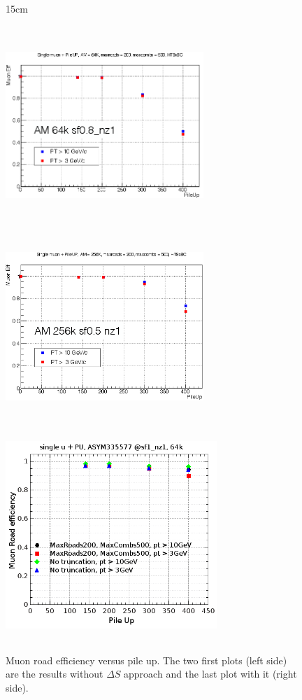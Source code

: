 \begin{figure}[htbp]{15cm}
	\caption{Muon road efficiency versus pile up. The two first plots (left side) are the results without $\Delta S$ approach and the last plot with it (right side).}
	\centering
	\includegraphics[width=7.5cm,height=7.5cm]{AppendixCMSL1TT/luciano_mupu_sf0p8_plot}\\
	\includegraphics[width=7.5cm,height=7.5cm]{AppendixCMSL1TT/luciano_mupu_sf0p5_plot}\\
	\includegraphics[width=8cm,height=8cm]{AppendixCMSL1TT/figs/muon_road_eff_vs_pile_up_deltaS}
	\label{fig:deltaS_on_pile_up}
\end{figure}


